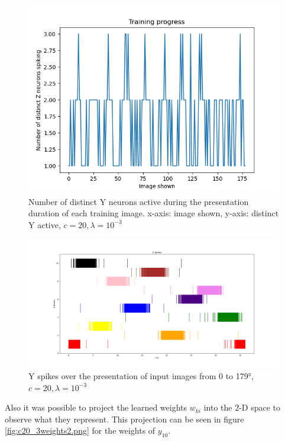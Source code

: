 \begin{figure}
  \includegraphics[width=\linewidth]{figures/angleNetwork/c20_3validationDistinctZSpikes.png}
  \caption{Number of distinct Y neurons active during the presentation duration of each training image. x-axis: image shown, y-axis: distinct Y active, $c = 20, \lambda = 10^{-3}$}
  \label{fig:c20_3validationDistinctZSpikes}
\end{figure}

\begin{figure}
  \includegraphics[width=\linewidth]{figures/angleNetwork/c20_3validationZSpikes.png}
  \caption{Y spikes over the presentation of input images from 0 to 179°, $c = 20, \lambda = 10^{-3}$}
  \label{fig:c20_3validationZSpikes}
\end{figure}

Also it was possible to project the learned weights $w_{ki}$ into the 2-D space to observe what they represent. This projection can be seen in figure \ref{fig:c20_3weights2.png} for the weights of $y_{10}$.


